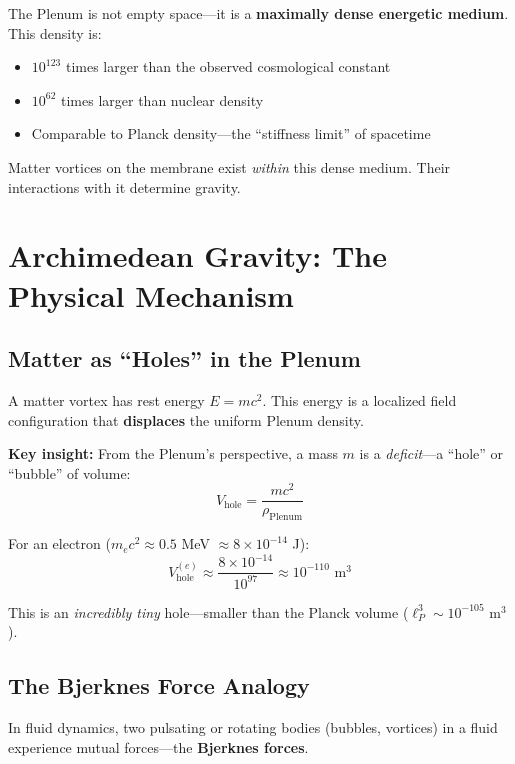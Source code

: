 The Plenum is not empty space—it is a \textbf{maximally dense energetic medium}. This density is:
\begin{itemize}
    \item $10^{123}$ times larger than the observed cosmological constant
    \item $10^{62}$ times larger than nuclear density
    \item Comparable to Planck density—the ``stiffness limit'' of spacetime
\end{itemize}

Matter vortices on the membrane exist \textit{within} this dense medium. Their interactions with it determine gravity.

\newpage

\section{Archimedean Gravity: The Physical Mechanism}
\label{sec:archimedean}

\subsection{Matter as ``Holes'' in the Plenum}

A matter vortex has rest energy $E = mc^2$. This energy is a localized field configuration that \textbf{displaces} the uniform Plenum density.

\textbf{Key insight:} From the Plenum's perspective, a mass $m$ is a \textit{deficit}—a ``hole'' or ``bubble'' of volume:
\begin{equation}
V_{\text{hole}} = \frac{mc^2}{\rho_{\text{Plenum}}}
\label{eq:hole_volume}
\end{equation}

For an electron ($m_e c^2 \approx 0.5$ MeV $\approx 8 \times 10^{-14}$ J):
\begin{equation}
V_{\text{hole}}^{(e)} \approx \frac{8 \times 10^{-14}}{10^{97}} \approx 10^{-110} \text{ m}^3
\end{equation}

This is an \textit{incredibly tiny} hole—smaller than the Planck volume ($\ell_P^3 \sim 10^{-105}$ m$^3$).

\subsection{The Bjerknes Force Analogy}

In fluid dynamics, two pulsating or rotating bodies (bubbles, vortices) in a fluid experience mutual forces—the \textbf{Bjerknes forces}.

